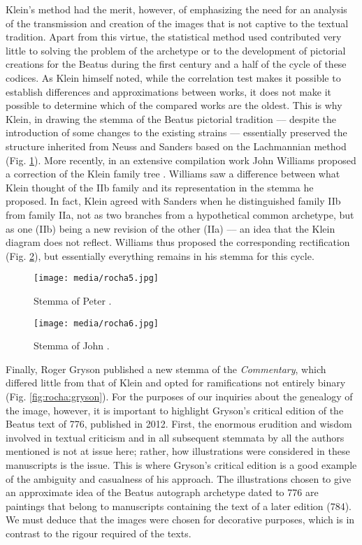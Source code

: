 \begin{paper}
Klein's method had the merit, however, of emphasizing the need for an
analysis of the transmission and creation of the images that is not
captive to the textual tradition. Apart from this virtue, the
statistical method used contributed very little to solving the problem
of the archetype or to the development of pictorial creations for the
Beatus during the first century and a half of the cycle of these
codices. As Klein himself noted, while the correlation test makes it
possible to establish differences and approximations between works, it
does not make it possible to determine which of the compared works are
the oldest. This is why Klein, in drawing the stemma of the
Beatus pictorial tradition –– despite the introduction of some changes
to the existing strains ––  essentially preserved the structure
inherited from Neuss and Sanders based on the Lachmannian method (Fig. \ref{fig:rocha:klein}). More recently, in an extensive compilation work John Williams
proposed a correction of the Klein family tree \citep[1:26]{williams_illustrated_1994}. Williams saw a difference between what Klein thought of the IIb
family and its representation in the stemma he proposed. In fact,
Klein agreed with Sanders when he distinguished family IIb from family
IIa, not as two branches from a hypothetical common archetype, but as
one (IIb) being a new revision of the other (IIa) ––  an idea that the
Klein diagram does not reflect. Williams thus proposed the corresponding
rectification (Fig. \ref{fig:rocha:williams}), but essentially everything remains in his
stemma for this cycle.

\begin{figure}[H]
    \centering
    \texttt{[image: media/rocha5.jpg]}
    \caption{Stemma of Peter \citet{klein_altere_1976}.}
    \label{fig:rocha:klein}
\end{figure}

\begin{figure}[H]
    \centering
    \texttt{[image: media/rocha6.jpg]}
    \caption{Stemma of John \citet{williams_illustrated_1994}.}
    \label{fig:rocha:williams}
\end{figure}

Finally, Roger Gryson published a new stemma of the
\emph{Commentary}, which differed little from that of Klein and opted
for ramifications not entirely binary (Fig. \ref{fig:rocha:gryson}). For the purposes of our inquiries about the genealogy of the image, however, it is important to
highlight Gryson's critical edition of the Beatus text of 776, published
in 2012. First, the enormous erudition and wisdom involved in textual
criticism and in all subsequent stemmata by all the authors
mentioned is not at issue here; rather, how illustrations were
considered in these manuscripts is the issue. This is where Gryson's
critical edition is a good example of the ambiguity and casualness of
his approach. The illustrations chosen to give an approximate idea of
the Beatus autograph archetype dated to 776 are paintings that belong to
manuscripts containing the text of a later edition (784). We must deduce
that the images were chosen for decorative purposes, which is in
contrast to the rigour required of the texts.


\end{paper}
